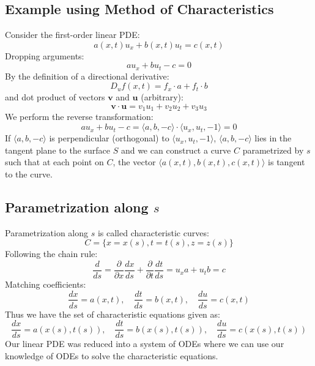 \documentclass{article}
\begin{document}
\subsection{Example using Method of Characteristics}
Consider the first-order linear PDE:
\begin{equation}
a(x, t)u_x + b(x, t)u_t = c(x, t)
\end{equation}
Dropping arguments:
\begin{equation}
a u_x + b u_t - c = 0
\end{equation}
By the definition of a directional derivative:
\begin{equation}
D_u f(x, t) = f_x \cdot a + f_t \cdot b
\end{equation}
and dot product of vectors \( \mathbf{v} \) and \( \mathbf{u} \) (arbitrary):
\begin{equation}
\mathbf{v} \cdot \mathbf{u} = v_1 u_1 + v_2 u_2 + v_3 u_3
\end{equation}
We perform the reverse transformation:
\begin{equation}
a u_x + b u_t - c = \langle a, b, -c \rangle \cdot \langle u_x, u_t, -1 \rangle = 0
\end{equation}
If \( \langle a, b, -c \rangle \) is perpendicular (orthogonal) to \( \langle u_x, u_t, -1 \rangle \), \( \langle a, b, -c \rangle \) lies in the tangent plane to the surface \( S \) and we can construct a curve \( C \) parametrized by \( s \) such that at each point on \( C \), the vector \( \langle a(x, t), b(x, t), c(x, t) \rangle \) is tangent to the curve.

\subsection{Parametrization along \(s\)}
Parametrization along \(s\) is called characteristic curves:
\begin{equation}
C = \{x = x(s), t = t(s), z = z(s)\}
\end{equation}
Following the chain rule:
\begin{equation}
\frac{d}{ds} = \frac{\partial}{\partial x} \frac{dx}{ds} + \frac{\partial}{\partial t} \frac{dt}{ds} = u_x a + u_t b = c
\end{equation}
Matching coefficients:
\begin{equation}
\frac{dx}{ds} = a(x, t), \quad \frac{dt}{ds} = b(x, t), \quad \frac{du}{ds} = c(x, t)
\end{equation}
Thus we have the set of characteristic equations given as:
\begin{equation}
\frac{dx}{ds} = a(x(s), t(s)), \quad \frac{dt}{ds} = b(x(s), t(s)), \quad \frac{du}{ds} = c(x(s), t(s))
\end{equation}
Our linear PDE was reduced into a system of ODEs where we can use our knowledge of ODEs to solve the characteristic equations.
\end{document}
